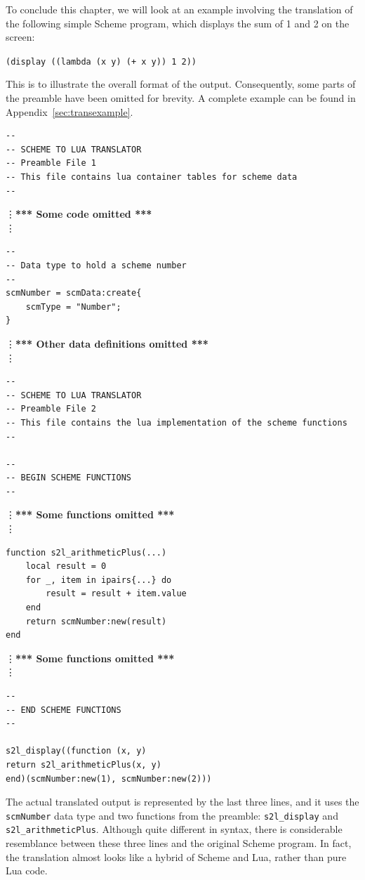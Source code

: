 To conclude this chapter, we will look at an example involving the translation
of the following simple Scheme program, which displays the sum of 1 and 2 on the
screen:
\begin{framed}
\centering
\texttt{(display ((lambda (x y) (+ x y)) 1 2))}
\end{framed}
This is to illustrate the overall format of the output. Consequently, some parts
of the preamble have been omitted for brevity. A complete example can be found
in Appendix~\ref{sec:transexample}.

\begin{framed}
\scriptsize
\begin{verbatim}
--
-- SCHEME TO LUA TRANSLATOR
-- Preamble File 1
-- This file contains lua container tables for scheme data
--
\end{verbatim}
\vdots \textbf{*** Some code omitted ***}\\ \vdots
\begin{verbatim}
--
-- Data type to hold a scheme number
--
scmNumber = scmData:create{
    scmType = "Number";
}
\end{verbatim}
\vdots \textbf{*** Other data definitions omitted ***}\\ \vdots
\begin{verbatim}
--
-- SCHEME TO LUA TRANSLATOR
-- Preamble File 2
-- This file contains the lua implementation of the scheme functions
--

--
-- BEGIN SCHEME FUNCTIONS
--
\end{verbatim}
\vdots \textbf{*** Some functions omitted ***}\\ \vdots
\begin{verbatim}
function s2l_arithmeticPlus(...)
    local result = 0
    for _, item in ipairs{...} do
        result = result + item.value
    end
    return scmNumber:new(result)
end
\end{verbatim}
\vdots \textbf{*** Some functions omitted ***}\\ \vdots
\begin{verbatim}
--
-- END SCHEME FUNCTIONS
--

s2l_display((function (x, y)
return s2l_arithmeticPlus(x, y)
end)(scmNumber:new(1), scmNumber:new(2)))
\end{verbatim}
\end{framed}

The actual translated output is represented by the last three lines, and it uses
the \texttt{scmNumber} data type and two functions from the preamble:
\texttt{s2l\_display} and \texttt{s2l\_arithmeticPlus}. Although quite different
in syntax, there is considerable resemblance between these three lines and the
original Scheme program. In fact, the translation almost looks like a hybrid of
Scheme and Lua, rather than pure Lua code.
